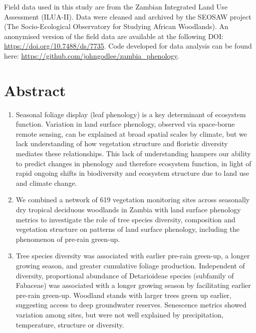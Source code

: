 \documentclass[11pt,a4paper]{article}
\begin{document}
Field data used in this study are from the Zambian Integrated Land Use
Assessment (ILUA-II). Data were cleaned and archived by the SEOSAW project (The
Socio-Ecological Observatory for Studying African Woodlands). An anonymised
version of the field data are available at the following DOI:
\url{https://doi.org/10.7488/ds/7735}. Code developed for data analysis can be
found here: \url{https://github.com/johngodlee/zambia_phenology}.

\newpage{}
\linenumbers

\section*{Abstract}

\begin{enumerate}
	\item{Seasonal foliage display (leaf phenology) is a key determinant of
			ecosystem function. Variation in land surface phenology, observed
			via space-borne remote sensing, can be explained at broad spatial
			scales by climate, but we lack understanding of how vegetation
			structure and floristic diversity mediates these relationships.
			This lack of understanding hampers our ability to predict changes
			in phenology and therefore ecosystem function, in light of rapid
			ongoing shifts in biodiversity and ecosystem structure due to land
			use and climate change.}
		
	\item{We combined a network of 619 vegetation monitoring sites across
			seasonally dry tropical deciduous woodlands in Zambia with land
			surface phenology metrics to investigate the role of tree species
			diversity, composition and vegetation structure on patterns of land
			surface phenology, including the phenomenon of pre-rain green-up.} 

	\item{Tree species diversity was associated with earlier pre-rain green-up,
			a longer growing season, and greater cumulative foliage production.
			Independent of diversity, proportional abundance of Detarioideae
			species (subfamily of Fabaceae) was associated with a longer
			growing season by facilitating earlier pre-rain green-up. Woodland
			stands with larger trees green up earlier, suggesting access to
			deep groundwater reserves. Senescence metrics showed variation
			among sites, but were not well explained by precipitation,
			temperature, structure or diversity.}


\end{enumerate}
\end{document}
